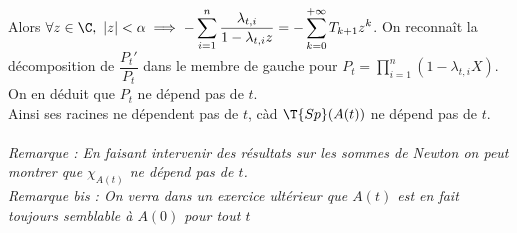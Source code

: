 \documentclass{book}
\begin{document}
\begin{enumerate}[leftmargin=*]
		Alors $\forall z\in \C,\ |z|<\alpha\implies \displaystyle-\sum_{i=1}^n\frac{\lambda_{t,i}}{1-\lambda_{t,i}z}=-\sum_{k=0}^{+\infty}T_{k+1}z^k$. On reconnaît la décomposition de $\dfrac{P_t'}{P_t}$ dans le membre de gauche pour $P_t=\displaystyle\prod_{i=1}^n(1-\lambda_{t,i}X)$. On en déduit que $P_t$ ne dépend pas de $t$.\\
		Ainsi ses racines ne dépendent pas de $t$, càd $\T{Sp}(A(t))$ ne dépend pas de $t$.\\\\
		\textit{Remarque : En faisant intervenir des résultats sur les sommes de Newton on peut montrer que $\chi_{A(t)}$ ne dépend pas de $t$.}\\
		\textit{Remarque bis : On verra dans un exercice ultérieur que $A(t)$ est en fait toujours semblable à $A(0)$ pour tout $t$}
	\end{enumerate}
	
\end{document}
